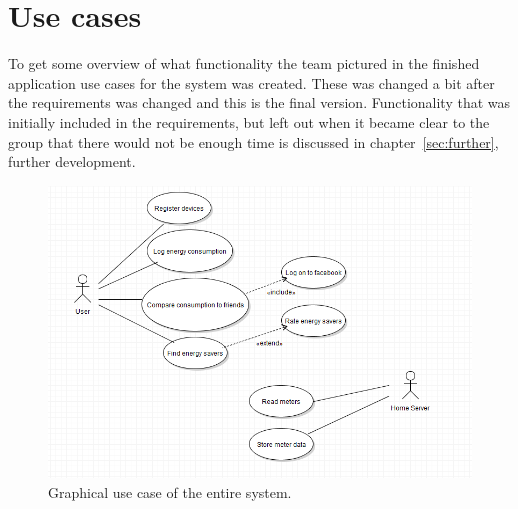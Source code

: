 \section{Use cases}
To get some overview of what functionality the team pictured in the finished application use cases for the system was created. These was changed a bit after the requirements was changed and this is the final version. Functionality that was initially included in the requirements, but left out when it became clear to the group that there would not be enough time is discussed in chapter~\ref{sec:further}, further development.


\begin{figure}[H]
\includegraphics[width=\textwidth]{ch/specification/fig/usecase.PNG}
\caption{Graphical use case of the entire system.}
\label{fig:usecase}
\end{figure}
